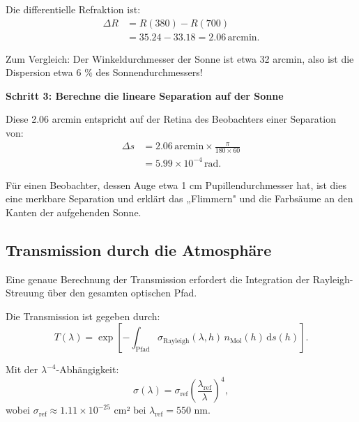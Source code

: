 \documentclass[12pt,a4paper]{article}
\begin{document}
Die differentielle Refraktion ist:
\begin{equation}
  \begin{aligned}
  \Delta R
  &= R(380) - R(700) \\
  &= 35.24 - 33.18 = \boxed{2.06\,\text{arcmin}}.
  \end{aligned}
	\label{eq:delta_R_concrete}
\end{equation}

Zum Vergleich: Der Winkeldurchmesser der Sonne ist etwa 32 arcmin,
also ist die Dispersion etwa 6 \% des Sonnendurchmessers!

\textbf{Schritt 3: Berechne die lineare Separation auf der Sonne}

Diese 2.06 arcmin entspricht auf der Retina des Beobachters einer Separation von:
\begin{equation}
  \begin{aligned}
  \Delta s
  &= 2.06\,\text{arcmin} \times \frac{\pi}{180 \times 60} \\
  &= 5.99 \times 10^{-4}\,\text{rad}.
  \end{aligned}
	\label{eq:linear_sep}
\end{equation}

Für einen Beobachter, dessen Auge etwa 1 cm Pupillendurchmesser hat,
ist dies eine merkbare Separation und erklärt das „Flimmern" und die
Farbsäume an den Kanten der aufgehenden Sonne.

\subsection{Transmission durch die Atmosphäre}
\label{subsec:transmission_detail}

Eine genaue Berechnung der Transmission erfordert die Integration der
Rayleigh-Streuung über den gesamten optischen Pfad.

Die Transmission ist gegeben durch:
\begin{equation}
	T(\lambda) = \exp\left[-\int_{\text{Pfad}} \sigma_{\mathrm{Rayleigh}}(\lambda, h) \, n_{\mathrm{Mol}}(h) \, \mathrm{d}s(h)\right].
	\label{eq:transmission_integral}
\end{equation}

Mit der $\lambda^{-4}$-Abhängigkeit:
\begin{equation}
	\sigma(\lambda) = \sigma_{\mathrm{ref}} \left(\frac{\lambda_{\mathrm{ref}}}{\lambda}\right)^4,
	\label{eq:sigma_wavelength}
\end{equation}
wobei $\sigma_{\mathrm{ref}} \approx 1.11 \times 10^{-25}$ cm² bei $\lambda_{\mathrm{ref}} = 550$ nm.
\end{document}
